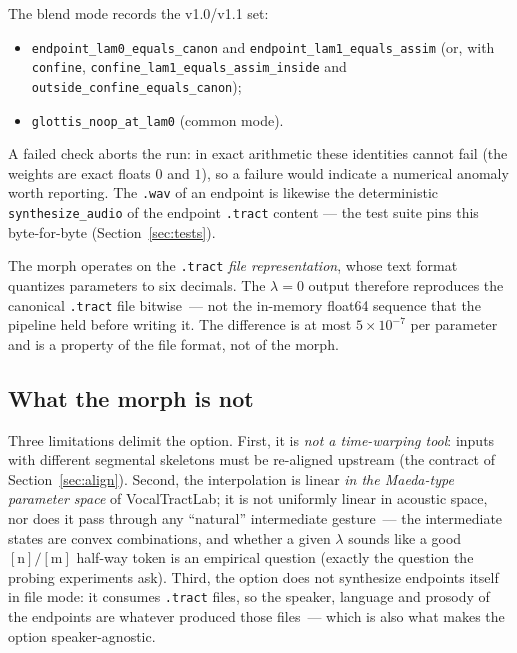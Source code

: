 \documentclass[11pt,a4paper]{article}
\newcommand{\lam}{\lambda}
\newcommand{\code}[1]{\texttt{#1}}
\newcommand{\sectref}[1]{Section~\ref{#1}}
\begin{document}
The blend mode records the v1.0/v1.1 set:
\begin{itemize}[leftmargin=1.6em]
\item \code{endpoint\_lam0\_equals\_canon} and
  \code{endpoint\_lam1\_equals\_assim} (or, with \code{confine},
  \code{confine\_lam1\_equals\_assim\_inside} and
  \code{outside\_confine\_equals\_canon});
\item \code{glottis\_noop\_at\_lam0} (common mode).
\end{itemize}

A failed check aborts the run: in exact arithmetic these identities
cannot fail (the weights are exact floats $0$ and $1$), so a
failure would indicate a numerical anomaly worth reporting.  The
\code{.wav} of an endpoint is likewise the deterministic
\code{synthesize\_audio} of the endpoint \code{.tract} content ---
the test suite pins this byte-for-byte
(\sectref{sec:tests}).

\begin{keybox}
The morph operates on the \code{.tract} \emph{file representation},
whose text format quantizes parameters to six decimals.  The
$\lam=0$ output therefore reproduces the canonical \code{.tract}
file bitwise~--- not the in-memory float64 sequence that the
pipeline held before writing it.  The difference is at most
$5 \times 10^{-7}$ per parameter and is a property of the file
format, not of the morph.
\end{keybox}

\subsection{What the morph is not}

Three limitations delimit the option.  First, it is \emph{not a
time-warping tool}: inputs with different segmental skeletons must
be re-aligned upstream (the contract of \sectref{sec:align}).
Second, the interpolation is linear \emph{in the Maeda-type
parameter space} of VocalTractLab; it is not uniformly linear in
acoustic space, nor does it pass through any ``natural'' intermediate
gesture~--- the intermediate states are convex combinations, and
whether a given $\lam$ sounds like a good $[\text{n}]/[\text{m}]$
half-way token is an empirical question (exactly the question the
probing experiments ask).  Third, the option does not synthesize
endpoints itself in file mode: it consumes \code{.tract} files, so
the speaker, language and prosody of the endpoints are whatever
produced those files~--- which is also what makes the option
speaker-agnostic.
\end{document}
